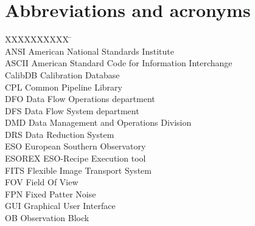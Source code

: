\section{Abbreviations and acronyms}
\label{ABBREVIATIONS}

\begin{tabbing}
XXXXXXXXXX \= \kill\\
ANSI       \> American National Standards Institute \\
ASCII      \> American Standard Code for Information Interchange \\
CalibDB    \> Calibration Database \\
CPL        \> Common Pipeline Library\\
DFO        \> Data Flow Operations department \\
DFS        \> Data Flow System department \\
DMD        \> Data Management and Operations Division \\
DRS        \> Data Reduction System \\
ESO        \> European Southern Observatory \\
ESOREX     \> ESO-Recipe Execution tool\\
FITS       \> Flexible Image Transport System \\
FOV       \> Field Of View \\
FPN       \> Fixed Patter Noise \\
GUI        \> Graphical User Interface \\
OB         \> Observation Block \\

\end{tabbing}
